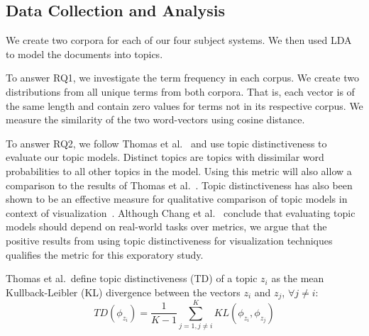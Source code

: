 
\subsection{Data Collection and Analysis}

We create two corpora for each of our four subject systems.
We then used LDA to model the documents into topics.

To answer RQ1, we investigate the term frequency in each corpus.
We create two distributions from all unique terms from both corpora.
That is, each vector is of the same length and contain zero values for terms not in its respective corpus.
We measure the similarity of the two word-vectors using cosine distance.

To answer RQ2, we follow Thomas et al.~\cite{Thomas-etal:2011} 
and use topic distinctiveness to evaluate our topic models.
Distinct topics are topics with dissimilar word probabilities to all other topics in the model.
Using this metric will also allow a comparison to the results of Thomas et al.~\cite{Thomas-etal:2011}. 
Topic distinctiveness has also been shown to be an effective measure for qualitative
comparison of topic models in context of visualization~\cite{Wei-etal:2010, Chuang-etal:2012}.
Although Chang et al.~\cite{Chang-etal:2009} conclude that evaluating topic models
should depend on real-world tasks over metrics,
we argue that the positive results from using topic distinctiveness for visualization
techniques qualifies the metric for this exporatory study.

Thomas et al.\ define topic distinctiveness (TD) of a topic $z_i$ as the mean
Kullback-Leibler (KL) divergence between the vectors $z_i$ and $z_j$, $\forall j \neq i$:
\begin{equation}
TD(\phi_{z_i}) =
\frac{1}{K - 1}
\sum_{j=1,j \neq i}^{K}
KL(\phi_{z_i}, \phi_{z_j})
\label{eq:topicdistinctiveness}
\end{equation}

